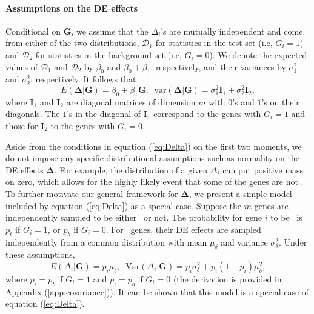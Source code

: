 	\paragraph{Assumptions on the DE effects}\label{subsection:DeltaModel}
	Conditional on $\bm G$, we assume that the $\Delta_i$'s are mutually independent and come from
	either of the two distributions, $\mathscr{D}_1$ for statistics in the test set (i.e, $G_i = 
	1$) and $\mathscr{D}_2$ for statistics in the background set (i.e, $G_i 
	= 0$). We denote the expected values of $\mathscr{D}_1$ and $\mathscr{D}_2$ by $\beta_0$ 
	and	$\beta_0+\beta_1$, respectively, and their variances by $\sigma_1^2$ and $\sigma_2^2$, 
    respectively. It follows that 
	\begin{equation}
	\label{eq:Delta}
	E(\bm \Delta|\bm G)=\beta_0 + \beta_1 \bm G,\;\; \mbox{var}(\bm \Delta|\bm G) = \sigma_1^2\bm
	I_1+\sigma_2^2\bm I_2,
	\end{equation} 
	where $\bm I_1$ and $\bm I_2$ are diagonal matrices of dimension $m$ with $0$'s and $1$'s on 
	their diagonals. The $1$'s in the diagonal of $\bm I_1$ correspond to the genes with $G_i=1$ 
	and those for $\bm I_2$ to the genes with $G_i=0$.
	
	Aside from the conditions in equation (\ref{eq:Delta}) on the first two moments, we do not 
	impose any specific distributional assumptions such as normality on the DE effects $\bm 
	\Delta$. For example, 
	the distribution of a given $\Delta_i$ can put positive mass on zero, which allows for the 
	highly likely event that some of the genes are not \DED. To further motivate our general 
	framework for $\bm \Delta$, we present a simple model included by equation (\ref{eq:Delta}) as 
	a special case. Suppose the $m$ genes are independently sampled to be either \DED~or not. The 
	probability for gene $i$ to be \DED~is $p_t$ if $G_i=1$, or $p_b$ if $G_i=0$. For \DED~genes, 
	their DE effects are sampled independently from a common distribution with mean $\mu_\delta$ 
	and variance $\sigma^2_\delta$. Under these	assumptions, 
	\begin{equation}
	\label{eq:DeltaBinom}
	E(\Delta_i|\bm G) = p_i\mu_{\delta},\;\; \text{Var}(\Delta_i|\bm G)= p_i\sigma_{\delta}^2 +
	p_i(1-p_i)\mu_{\delta}^2,
	\end{equation}
	where $p_i=p_{t}$ if $G_i=1$ and $p_i=p_{b}$ if $G_i=0$ (the derivation is provided in Appendix 
	(\ref{app:covariance})). It can be shown that this model is a special case of equation 
	(\ref{eq:Delta}).
	
